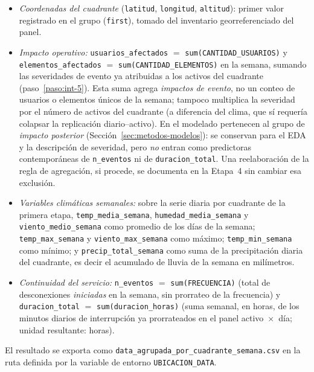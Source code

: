     \begin{itemize}
        \item \textit{Coordenadas del cuadrante} (\texttt{latitud}, \texttt{longitud}, \texttt{altitud}): primer valor registrado en el grupo (\texttt{first}), tomado del inventario georreferenciado del panel.
        
        \item \textit{Impacto operativo:} \texttt{usuarios\_afectados} $=$ \texttt{sum(CANTIDAD\_USUARIOS)} y \texttt{elementos\_afectados} $=$ \texttt{sum(CANTIDAD\_ELEMENTOS)} en la semana, sumando las severidades de evento ya atribuidas a los activos del cuadrante (paso~\ref{paso:int-5}). Esta suma agrega \textit{impactos de evento}, no un conteo de usuarios o elementos únicos de la semana; tampoco multiplica la severidad por el número de activos del cuadrante (a diferencia del clima, que sí requería colapsar la replicación diario--activo). En el modelado pertenecen al grupo de \textit{impacto posterior} (Sección~\ref{sec:metodos-modelos}): se conservan para el EDA y la descripción de severidad, pero \textit{no} entran como predictoras contemporáneas de \texttt{n\_eventos} ni de \texttt{duracion\_total}. Una reelaboración de la regla de agregación, si procede, se documenta en la Etapa~4 sin cambiar esa exclusión.
        
        \item \textit{Variables climáticas semanales:} sobre la serie diaria por cuadrante de la primera etapa, \texttt{temp\_media\_semana}, \texttt{humedad\_media\_semana} y \texttt{viento\_medio\_semana} como promedio de los días de la semana; \texttt{temp\_max\_semana} y \texttt{viento\_max\_semana} como máximo; \texttt{temp\_min\_semana} como mínimo; y \texttt{precip\_total\_semana} como suma de la precipitación diaria del cuadrante, es decir el acumulado de lluvia de la semana en milímetros.
        
        \item \textit{Continuidad del servicio:} \texttt{n\_eventos} $=$ \texttt{sum(FRECUENCIA)} (total de desconexiones \textit{iniciadas} en la semana, sin prorrateo de la frecuencia) y \texttt{duracion\_total} $=$ \texttt{sum(duracion\_horas)} (suma semanal, en horas, de los minutos diarios de interrupción ya prorrateados en el panel activo~$\times$~día; unidad resultante: horas).
    \end{itemize}
    
    El resultado se exporta como \texttt{data\_agrupada\_por\_cuadrante\_semana.csv} en la ruta definida por la variable de entorno \texttt{UBICACION\_DATA}.
    
